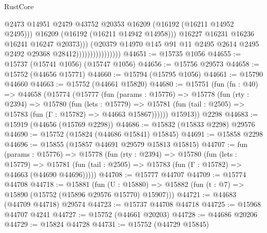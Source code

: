 \begin{lexlean}{RustCore}
\begin{coremodule}
                                            @2473
                                            @14951
                                            @2479
                                            @43752
                                            @20353
                                            @16209
                                            (@16192 (@16211 @14952 @2495)))
                                          @16209
                                          (@16192 (@16211 @14942 @14958)))
                                        @16227
                                        @16231
                                        @16236
                                        @16241
                                        @16247
                                        @20373)))
                                  (@20379
                                    @14970
                                    @145
                                    @91
                                    @11
                                    @2495
                                    @2614
                                    @2495
                                    @2492
                                    @29368
                                    @28412))))))))))))))))
@44651 := @15735 @1056
@44655 := @15737 (@15741 @1056) (@15747 @1056)
@44656 := @15756 @29573
@44658 := @15752 (@44656 @15771)
@44660 := @15794 (@15795 @1056)
@44661 := @15790 @44660
@44663 := @15752 (@44661 @15820)
@44680 := @15751
    (fun (fn : @40) =>
    @44658
      (@15774
        (@15777
          (fun (params : @15776) =>
          @15778
            (fun (rty : @2394) =>
            @15780
              (fun (lets : @15779) =>
              @15781 (fun (tail : @2505) => @15783 (fun (Γ : @15782) => @44663 @15867))))))
        @15913))
    @2298
@44683 := @15919 (@44656 (@15769 @2298))
@44686 := @15832 (@15833 @2298) @29576
@44690 := @15752 (@15824 (@44686 @15841) @15845)
@44691 := @15858 @2298
@44696 := @15855 (@15857 @44691 @29579 @15813 @15815)
@44707 := fun (params : @15776) =>
  @15778
    (fun (rty : @2394) =>
    @15780
      (fun (lets : @15779) =>
      @15781 (fun (tail : @2505) => @15783 (fun (Γ : @15782) => @44663 (@44690 @44696)))))
@44708 := @15777 @44707
@44709 := @15774 @44708
@44718 := @15881
    (fun (U : @15880) => @15882 (fun (t : @7) => @15890 (@15752 (@15896 @29576 @15770) @15907)))
@44721 := @44683 (@44709 @44718) @29574
@44723 := @15737 @44708 @44718
@44725 := @15968 @44707 @4241
@44727 := @15752 (@44661 @20203)
@44728 := @44686 @20206
@44729 := @15824 @44728
@44731 := @15752 (@44729 @15845)

\end{coremodule}
\end{lexlean}
